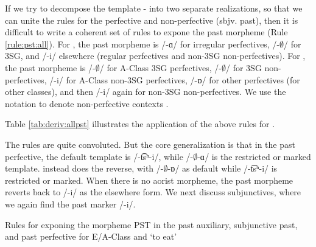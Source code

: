 	
	If we try to decompose the template {\aor}-{\pst} into two separate realizations, so that we can unite the rules for the perfective and non-perfective (sbjv. past),  then it is difficult to write a coherent set of rules to expone the past morpheme (Rule \ref{rule:pst:all}). For {\seaSEA}, the past morpheme is /-ɑ/ for irregular perfectives, /-$\emptyset$/ for   3SG, and /-i/ elsewhere (regular perfectives and non-3SG non-perfectives). For {\iaIA}, the past morpheme is /-$\emptyset$/ for A-Class 3SG perfectives,  /-$\emptyset$/ for  3SG non-perfectives,  /-i/ for A-Class non-3SG perfectives, /-ɒ/ for other perfectives (for other classes), and then /-i/ again for non-3SG non-perfectives. We use the notation {\neg\aor} to denote non-perfective contexts \citep[cf.][49]{siddiqi-2009-syntaxWithinWordEconomyAllomorphyArgumentSeelctionDistributedMorphology}. 
	
	
	
	
	Table \ref{tab:deriv:allpst} illustrates the application of the above rules for {\iaIA}. 
	
	
	
	
	The rules are quite convoluted. But the core generalization is that in the past perfective, the default template is /{-t͡sʰ-i}/, while /{-$\emptyset$-ɑ}/ is the restricted or marked template. {\iaIA} instead does the reverse, with /{-$\emptyset$-ɒ}/ as default while /{-t͡sʰ-i}/ is restricted or marked. When there is no aorist morpheme, the past morpheme reverts back to /-i/ as the elsewhere form. We next discuss subjunctives, where we again find the past marker /{-i}/.
	
	\begin{newruleblock}
		{Rules for exponing the morpheme {PST} in the past auxiliary, subjunctive past, and past perfective for E/A-Class and `to eat'}%
		
	\end{newruleblock} 
	
